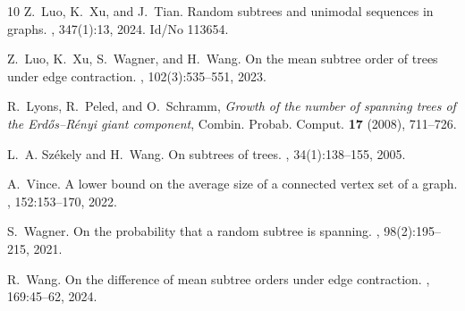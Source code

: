 \documentclass[11pt]{article}
\newtheorem{lem}[thr]{Lemma}
\theoremstyle{definition}
\begin{document}
\begin{thebibliography}{10}
Z.~Luo, K.~Xu, and J.~Tian.
\newblock Random subtrees and unimodal sequences in graphs.
, 347(1):13, 2024.
\newblock Id/No 113654.

Z.~Luo, K.~Xu, S.~Wagner, and H.~Wang.
\newblock On the mean subtree order of trees under edge contraction.
, 102(3):535--551, 2023.

R.~Lyons, R.~Peled, and O.~Schramm,
\emph{Growth of the number of spanning trees of the
Erd\H{o}s--R\'enyi giant component},
Combin. Probab. Comput. \textbf{17} (2008), 711--726.

L.~A. Sz\'ekely and H.~Wang.
\newblock On subtrees of trees.
, 34(1):138--155, 2005.

A.~Vince.
\newblock A lower bound on the average size of a connected vertex set of a
  graph.
, 152:153--170, 2022.

S.~Wagner.
\newblock On the probability that a random subtree is spanning.
, 98(2):195--215, 2021.

R.~Wang.
\newblock On the difference of mean subtree orders under edge contraction.
, 169:45--62, 2024.



\end{thebibliography}





\end{document}
